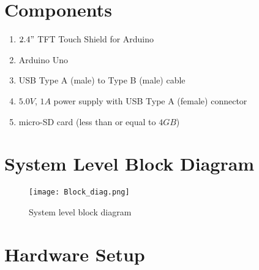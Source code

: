 \documentclass[
12pt, %
a4paper, %
oneside, %
headinclude,footinclude, %
BCOR5mm, %
]{scrartcl}
\begin{document}



\newpage %

\section{Components}

\begin{enumerate}
\item $2.4"$ TFT Touch Shield for Arduino
\item Arduino Uno
\item USB Type A (male) to Type B (male) cable
\item $5.0V$, $1A$ power supply with USB Type A (female) connector
\item micro-SD card (less than or equal to $4GB$)
\end{enumerate}

\section{System Level Block Diagram}

\begin{figure}[tbh]
\centering
\texttt{[image: Block\_diag.png]} 
\caption{System level block diagram} %
\label{fig:block_diag}
\end{figure}
 

\section{Hardware Setup}
\end{document}
